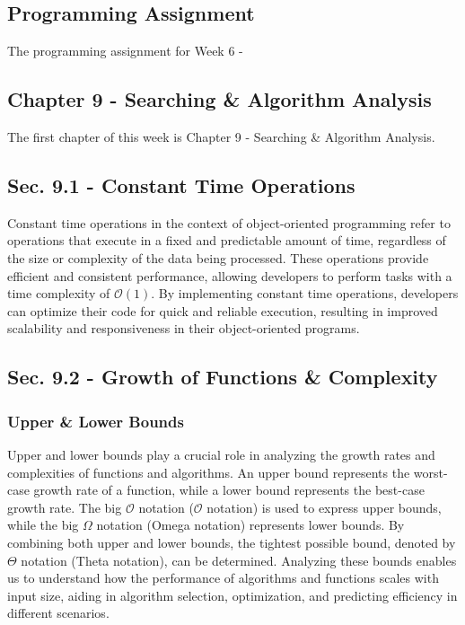 \subsection{Programming Assignment}

The programming assignment for Week 6 - 

\subsection{Chapter 9 - Searching \& Algorithm Analysis}

The first chapter of this week is Chapter 9 - Searching \& Algorithm Analysis.

\subsection*{Sec. 9.1 - Constant Time Operations}

Constant time operations in the context of object-oriented programming refer to operations that execute in a fixed and predictable amount of time, regardless of the size or complexity of the data being processed. These operations provide efficient and consistent performance, allowing developers to perform tasks with a time complexity of $\mathcal{O}(1)$. 
By implementing constant time operations, developers can optimize their code for quick and reliable execution, resulting in improved scalability and responsiveness in their object-oriented programs.

\subsection*{Sec. 9.2 - Growth of Functions \& Complexity}

\subsubsection{Upper \& Lower Bounds}

Upper and lower bounds play a crucial role in analyzing the growth rates and complexities of functions and algorithms. An upper bound represents the worst-case growth rate of a function, while a lower bound represents the best-case growth rate. The big $\mathcal{O}$ notation ($\mathcal{O}$ notation) is used to express upper bounds, while the big $\Omega$ notation (Omega notation) represents 
lower bounds. By combining both upper and lower bounds, the tightest possible bound, denoted by $\Theta$ notation (Theta notation), can be determined. Analyzing these bounds enables us to understand how the performance of algorithms and functions scales with input size, aiding in algorithm selection, optimization, and predicting efficiency in different scenarios.

